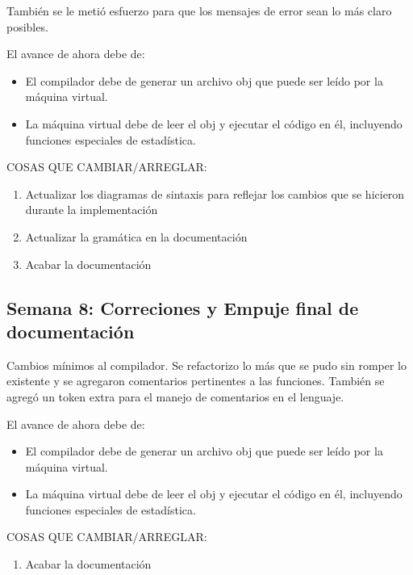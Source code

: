 También se le metió esfuerzo para que los mensajes de error sean lo más claro posibles.


El avance de ahora debe de:

\begin{itemize}
    \item El compilador debe de generar un archivo obj que puede ser leído por la máquina virtual.
    \item La máquina virtual debe de leer el obj y ejecutar el código en él, incluyendo funciones especiales de estadística.
\end{itemize}

COSAS QUE CAMBIAR/ARREGLAR:

\begin{enumerate}
    \item Actualizar los diagramas de sintaxis para reflejar los cambios que se hicieron durante la implementación
    \item Actualizar la gramática en la documentación 
    \item Acabar la documentación
\end{enumerate}

\subsection{Semana 8: Correciones y Empuje final de documentación}


Cambios mínimos al compilador. Se refactorizo lo más que se pudo sin romper lo existente y se agregaron comentarios pertinentes a las funciones. También se agregó un token extra para el manejo de comentarios en el lenguaje.


El avance de ahora debe de:

\begin{itemize}
    \item El compilador debe de generar un archivo obj que puede ser leído por la máquina virtual.
    \item La máquina virtual debe de leer el obj y ejecutar el código en él, incluyendo funciones especiales de estadística.
\end{itemize}

COSAS QUE CAMBIAR/ARREGLAR:

\begin{enumerate}
    \item Acabar la documentación
\end{enumerate}
